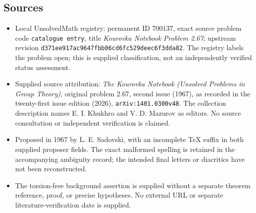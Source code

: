 \documentclass[11pt]{article}
\begin{document}
\subsection{Sources}
\begin{itemize}
\item Local UnsolvedMath registry: permanent ID \(700137\), exact source problem code \texttt{catalogue entry}, title \emph{Kourovka Notebook Problem 2.67}; upstream revision \texttt{d371ee917ac9647fbb06cd6fc529deec6f3dda82}. The registry labels the problem open; this is supplied classification, not an independently verified status assessment.
\item Supplied source attribution: \emph{The Kourovka Notebook (Unsolved Problems in Group Theory)}, original problem 2.67, second issue (1967), as recorded in the twenty-first issue edition (2026), \texttt{arXiv:1401.0300v48}. The collection description names E. I. Khukhro and V. D. Mazurov as editors. No source consultation or independent verification is claimed.
\item Proposed in 1967 by L. E. Sadovski, with an incomplete TeX suffix in both supplied proposer fields. The exact malformed spelling is retained in the accompanying ambiguity record; the intended final letters or diacritics have not been reconstructed.
\item The torsion-free background assertion is supplied without a separate theorem reference, proof, or precise hypotheses. No external URL or separate literature-verification date is supplied.
\end{itemize}
\end{document}

